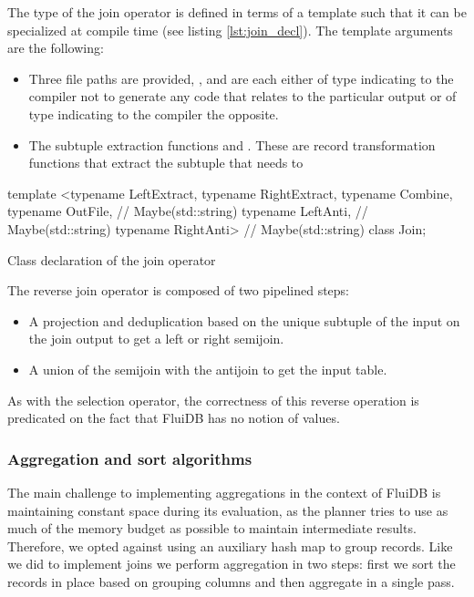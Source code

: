 The type of the join operator is defined in terms of a template such
that it can be specialized at compile time (see listing
\ref{lst:join_decl}). The template arguments are the following:

\begin{itemize}
\item Three file paths are provided, ,  and
   are each either of type  indicating to
  the compiler not to generate any code that relates to the particular
  output or of type  indicating to the compiler
  the opposite.
\item The subtuple extraction functions  and
  . These are record transformation functions that
  extract the subtuple that needs to
\end{itemize}

\begin{code}
\begin{cppcode}
template <typename LeftExtract, typename RightExtract, typename Combine,
          typename OutFile,    // Maybe(std::string)
          typename LeftAnti,   // Maybe(std::string)
          typename RightAnti>  // Maybe(std::string)
class Join;
\end{cppcode}
\caption{\label{lst:join_decl}Class declaration of the join operator}
\end{code}

The reverse join operator is composed of two pipelined steps:
\begin{itemize}
\item A projection and deduplication based on the unique subtuple of
the input on the join output to get a left or right semijoin.
\item A union of the semijoin with the antijoin to get the input table.
\end{itemize}

As with the selection operator, the correctness of this reverse
operation is predicated on the fact that FluiDB has no notion of
 values.

\subsubsection{Aggregation and sort algorithms}

The main challenge to implementing aggregations in the context of
FluiDB is maintaining constant space during its evaluation, as the
planner tries to use as much of the memory budget as possible to
maintain intermediate results. Therefore, we opted against using an
auxiliary hash map to group records. Like we did to implement
joins we perform aggregation in two steps: first we sort the records
in place based on grouping columns and then aggregate in a single
pass.

